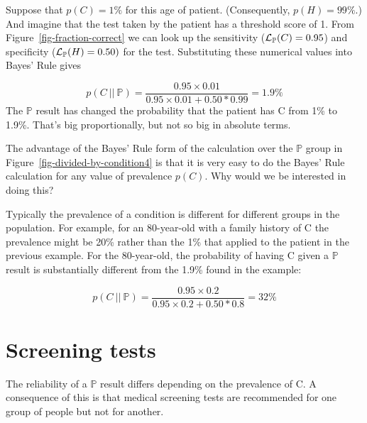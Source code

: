 \documentclass[
  letterpaper,
  DIV=11,
  numbers=noendperiod,
  oneside]{scrreprt}
\begin{document}
\begin{tcolorbox}[enhanced jigsaw, colbacktitle=quarto-callout-note-color!10!white, breakable, opacitybacktitle=0.6, colback=white, left=2mm, arc=.35mm, colframe=quarto-callout-note-color-frame, coltitle=black, toprule=.15mm, opacityback=0, leftrule=.75mm, bottomtitle=1mm, toptitle=1mm, titlerule=0mm, title=\textcolor{quarto-callout-note-color}{\faInfo}\hspace{0.5em}{Calculating \(p(C{\ |\!\!|\  } \mathbb{P})\)}, rightrule=.15mm, bottomrule=.15mm]

Suppose that \(p(C) = 1\%\) for this age of patient. (Consequently,
\(p(H) = 99\%\).) And imagine that the test taken by the patient has a
threshold score of 1. From Figure~\ref{fig-fraction-correct} we can look
up the sensitivity (\({\cal L}_{\mathbb{P}}(C) = 0.95\)) and specificity
(\({\cal L}_{\mathbb{P}}(H) = 0.50)\) for the test. Substituting these
numerical values into Bayes' Rule gives

\[p(C {\ |\!\!|\  } \mathbb{P}) = \frac{0.95\times 0.01}{0.95\times 0.01 + 0.50*0.99} = 1.9\%\]
The \(\mathbb{P}\) result has changed the probability that the patient
has C from 1\% to 1.9\%. That's big proportionally, but not so big in
absolute terms.

\end{tcolorbox}

The advantage of the Bayes' Rule form of the calculation over the
\(\mathbb{P}\) group in Figure~\ref{fig-divided-by-condition4} is that
it is very easy to do the Bayes' Rule calculation for any value of
prevalence \(p(C)\). Why would we be interested in doing this?

Typically the prevalence of a condition is different for different
groups in the population. For example, for an 80-year-old with a family
history of C the prevalence might be 20\% rather than the 1\% that
applied to the patient in the previous example. For the 80-year-old, the
probability of having C given a \(\mathbb{P}\) result is substantially
different from the 1.9\% found in the example:

\[p(C {\ |\!\!|\  } \mathbb{P}) = \frac{0.95\times 0.2}{0.95\times 0.2 + 0.50*0.8} = 32\%\]

\hypertarget{screening-tests}{%
\section{Screening tests}\label{screening-tests}}

The reliability of a \(\mathbb{P}\) result differs depending on the
prevalence of C. A consequence of this is that medical screening tests
are recommended for one group of people but not for another.
\end{document}
